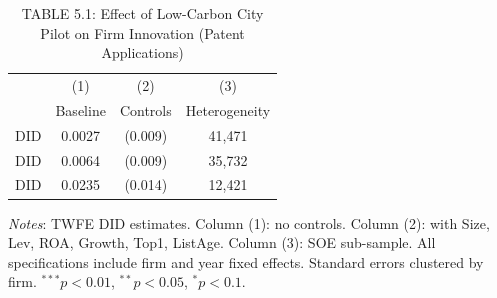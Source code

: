 \begin{table}[htbp]
\caption{TABLE 5.1: Effect of Low-Carbon City Pilot on Firm Innovation (Patent Applications)}
\label{tab:cs1-lcc}
\centering

\begin{threeparttable}
\begin{tabular}{lccc}
\toprule
                               & \multicolumn{1}{c}{(1)} & \multicolumn{1}{c}{(2)} & \multicolumn{1}{c}{(3)} \\
                               & \multicolumn{1}{c}{Baseline} & \multicolumn{1}{c}{Controls} & \multicolumn{1}{c}{Heterogeneity} \\
\midrule
  DID & 0.0027 & (0.009) & 41,471 \\
  DID & 0.0064 & (0.009) & 35,732 \\
  DID & 0.0235 & (0.014) & 12,421 \\
\midrule
\bottomrule
\end{tabular}
\begin{tablenotes}
\item \textit{Notes}: TWFE DID estimates. Column (1): no controls. Column (2): with Size, Lev, ROA, Growth, Top1, ListAge. Column (3): SOE sub-sample. All specifications include firm and year fixed effects. Standard errors clustered by firm. $^{***}p<0.01$, $^{**}p<0.05$, $^{*}p<0.1$.
\end{tablenotes}
\end{threeparttable}
\end{table}
